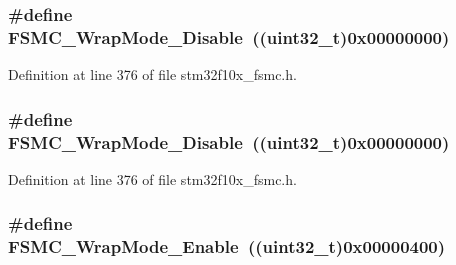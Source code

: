 \subsubsection[{\texorpdfstring{F\+S\+M\+C\+\_\+\+Wrap\+Mode\+\_\+\+Disable}{FSMC_WrapMode_Disable}}]{\setlength{\rightskip}{0pt plus 5cm}\#define F\+S\+M\+C\+\_\+\+Wrap\+Mode\+\_\+\+Disable~(({\bf uint32\+\_\+t})0x00000000)}\hypertarget{group___f_s_m_c___wrap___mode_ga6041f0d3055ea3811a5a19560092f266}{}\label{group___f_s_m_c___wrap___mode_ga6041f0d3055ea3811a5a19560092f266}


Definition at line 376 of file stm32f10x\+\_\+fsmc.\+h.

\subsubsection[{\texorpdfstring{F\+S\+M\+C\+\_\+\+Wrap\+Mode\+\_\+\+Disable}{FSMC_WrapMode_Disable}}]{\setlength{\rightskip}{0pt plus 5cm}\#define F\+S\+M\+C\+\_\+\+Wrap\+Mode\+\_\+\+Disable~(({\bf uint32\+\_\+t})0x00000000)}\hypertarget{group___f_s_m_c___wrap___mode_ga6041f0d3055ea3811a5a19560092f266}{}\label{group___f_s_m_c___wrap___mode_ga6041f0d3055ea3811a5a19560092f266}


Definition at line 376 of file stm32f10x\+\_\+fsmc.\+h.

\subsubsection[{\texorpdfstring{F\+S\+M\+C\+\_\+\+Wrap\+Mode\+\_\+\+Enable}{FSMC_WrapMode_Enable}}]{\setlength{\rightskip}{0pt plus 5cm}\#define F\+S\+M\+C\+\_\+\+Wrap\+Mode\+\_\+\+Enable~(({\bf uint32\+\_\+t})0x00000400)}\hypertarget{group___f_s_m_c___wrap___mode_gad07eb0ae0362b2f94071d0dab6473fda}{}\label{group___f_s_m_c___wrap___mode_gad07eb0ae0362b2f94071d0dab6473fda}



